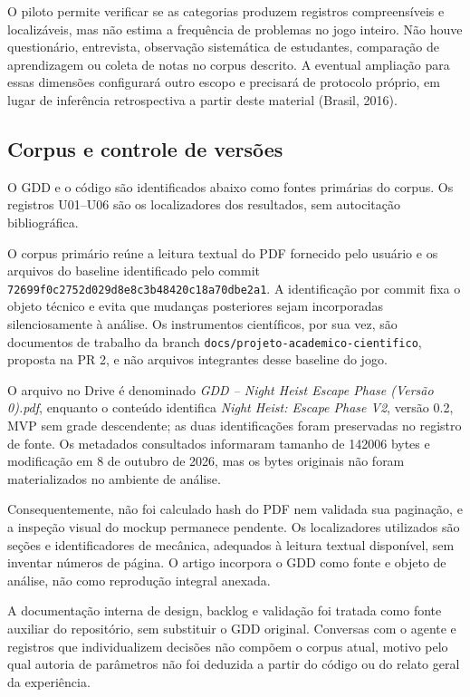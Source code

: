 O piloto permite verificar se as categorias produzem registros compreensíveis e localizáveis, mas não estima a frequência de problemas no jogo inteiro. Não houve questionário, entrevista, observação sistemática de estudantes, comparação de aprendizagem ou coleta de notas no corpus descrito. A eventual ampliação para essas dimensões configurará outro escopo e precisará de protocolo próprio, em lugar de inferência retrospectiva a partir deste material (Brasil, 2016).

\subsection{Corpus e controle de versões}
O GDD e o código são identificados abaixo como fontes primárias do corpus. Os registros U01--U06 são os localizadores dos resultados, sem autocitação bibliográfica.

O corpus primário reúne a leitura textual do PDF fornecido pelo usuário e os arquivos do baseline identificado pelo commit \nolinkurl{72699f0c2752d029d8e8c3b48420c18a70dbe2a1}. A identificação por commit fixa o objeto técnico e evita que mudanças posteriores sejam incorporadas silenciosamente à análise. Os instrumentos científicos, por sua vez, são documentos de trabalho da branch \texttt{docs/projeto-academico-cientifico}, proposta na PR 2, e não arquivos integrantes desse baseline do jogo.

O arquivo no Drive é denominado \emph{GDD -- Night Heist Escape Phase (Versão 0).pdf}, enquanto o conteúdo identifica \emph{Night Heist: Escape Phase V2}, versão 0.2, MVP sem grade descendente; as duas identificações foram preservadas no registro de fonte. Os metadados consultados informaram tamanho de 142006 bytes e modificação em 8 de outubro de 2026, mas os bytes originais não foram materializados no ambiente de análise.

Consequentemente, não foi calculado hash do PDF nem validada sua paginação, e a inspeção visual do mockup permanece pendente. Os localizadores utilizados são seções e identificadores de mecânica, adequados à leitura textual disponível, sem inventar números de página. O artigo incorpora o GDD como fonte e objeto de análise, não como reprodução integral anexada.

A documentação interna de design, backlog e validação foi tratada como fonte auxiliar do repositório, sem substituir o GDD original. Conversas com o agente e registros que individualizem decisões não compõem o corpus atual, motivo pelo qual autoria de parâmetros não foi deduzida a partir do código ou do relato geral da experiência.

